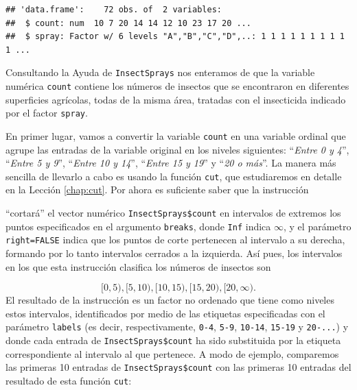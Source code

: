 \documentclass[]{book}
\newenvironment{Shaded}{\begin{snugshade}}{\end{snugshade}}
\newcommand{\DataTypeTok}[1]{\textcolor[rgb]{0.13,0.29,0.53}{#1}}
\newcommand{\DecValTok}[1]{\textcolor[rgb]{0.00,0.00,0.81}{#1}}
\newcommand{\KeywordTok}[1]{\textcolor[rgb]{0.13,0.29,0.53}{\textbf{#1}}}
\newcommand{\NormalTok}[1]{#1}
\newcommand{\OperatorTok}[1]{\textcolor[rgb]{0.81,0.36,0.00}{\textbf{#1}}}
\newcommand{\OtherTok}[1]{\textcolor[rgb]{0.56,0.35,0.01}{#1}}
\newcommand{\StringTok}[1]{\textcolor[rgb]{0.31,0.60,0.02}{#1}}
\theoremstyle{definition}
\theoremstyle{definition}
\theoremstyle{definition}
\theoremstyle{remark}
\begin{document}
\begin{verbatim}
## 'data.frame':    72 obs. of  2 variables:
##  $ count: num  10 7 20 14 14 12 10 23 17 20 ...
##  $ spray: Factor w/ 6 levels "A","B","C","D",..: 1 1 1 1 1 1 1 1 1 1 ...
\end{verbatim}

Consultando la Ayuda de \texttt{InsectSprays} nos enteramos de que la variable numérica \texttt{count} contiene los números de insectos que se encontraron en diferentes superficies agrícolas, todas de la misma área, tratadas con el insecticida indicado por el factor \texttt{spray}.

En primer lugar, vamos a convertir la variable \texttt{count} en una variable ordinal que agrupe las entradas de la variable original en los niveles siguientes: ``\emph{Entre 0 y 4}'', ``\emph{Entre 5 y 9}'', ``\emph{Entre 10 y 14}'', ``\emph{Entre 15 y 19}'' y ``\emph{20 o más}''. La manera más sencilla de llevarlo a cabo es usando la función \texttt{cut}, que estudiaremos en detalle en la Lección \ref{chap:cut}. Por ahora es suficiente saber que la instrucción

\begin{Shaded}
\end{Shaded}

``cortará'' el vector numérico \texttt{InsectSprays\$count} en intervalos de extremos los puntos especificados en el argumento \texttt{breaks}, donde \texttt{Inf} indica \(\infty\), y el parámetro \texttt{right=FALSE} indica que los puntos de corte pertenecen al intervalo a su derecha, formando por lo tanto intervalos cerrados a la izquierda. Así pues, los intervalos en los que esta instrucción clasifica los números de insectos son

\[
[0,5), [5,10), [10,15), [15,20), [20,\infty).
\]
El resultado de la instrucción es un factor no ordenado que tiene como niveles estos intervalos, identificados por medio de las etiquetas especificadas con el parámetro \texttt{labels} (es decir, respectivamente, \texttt{0-4}, \texttt{5-9}, \texttt{10-14}, \texttt{15-19} y \texttt{20-...}) y donde cada entrada de \texttt{InsectSprays\$count} ha sido substituida por la etiqueta correspondiente al intervalo al que pertenece. A modo de ejemplo, comparemos las primeras 10 entradas de \texttt{InsectSprays\$count} con las primeras 10 entradas del resultado de esta función \texttt{cut}:
\end{document}
